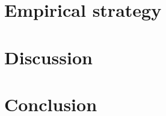 \section{Empirical strategy}


\section{Discussion}


\section{Conclusion}



\clearpage
\printbibliography
\clearpage

%
%
%
% 


